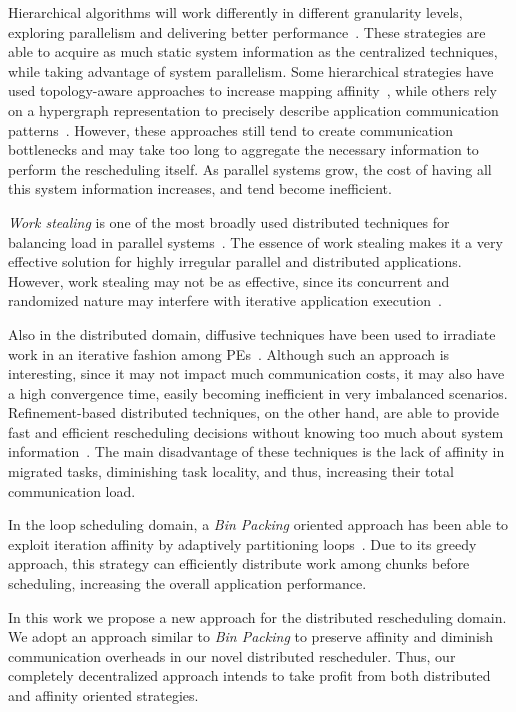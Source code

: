 Hierarchical algorithms will work differently in different granularity levels, exploring parallelism and delivering better performance~\cite{hybrid,nuco}.
These strategies are able to acquire as much static system information as the centralized techniques, while taking advantage of system parallelism.
Some hierarchical strategies have used topology-aware approaches to increase mapping affinity~\cite{nuco,hwtopo}, while others rely on a hypergraph representation to precisely describe application communication patterns~\cite{ZoltanParHypRepart07}.
However, these approaches still tend to create communication bottlenecks and may take too long to aggregate the necessary information to perform the rescheduling itself.
As parallel systems grow, the cost of having all this system information increases, and tend become inefficient.

\textit{Work stealing} is one of the most broadly used distributed techniques for balancing load in parallel systems~\cite{DBLP:journals/ijpp/YangH18,Janjic2013}.
The essence of work stealing makes it a very effective solution for highly irregular parallel and distributed applications.
However, work stealing may not be as effective, since its concurrent and randomized nature may interfere with iterative application execution~\cite{lifflander2012work}.

Also in the distributed domain, diffusive techniques have been used to irradiate work in an iterative fashion among PEs~\cite{diffus}.
Although such an approach is interesting, since it may not impact much communication costs, it may also have a high convergence time, easily becoming inefficient in very imbalanced scenarios.
Refinement-based distributed techniques, on the other hand, are able to provide fast and efficient rescheduling decisions without knowing too much about system information~\cite{grapevine}.
The main disadvantage of these techniques is the lack of affinity in migrated tasks, diminishing task locality, and thus, increasing their total communication load.

In the loop scheduling domain, a \textit{Bin Packing} oriented approach has been able to exploit iteration affinity by adaptively partitioning loops~\cite{Castro-Penna-WSCAD:2017}.
Due to its greedy approach, this strategy can efficiently distribute work among chunks before scheduling, increasing the overall application performance.

In this work we propose a new approach for the distributed rescheduling domain.
We adopt an approach similar to \textit{Bin Packing} to preserve affinity and diminish communication overheads in our novel distributed rescheduler.
Thus, our completely decentralized approach intends to take profit from both distributed and affinity oriented strategies.